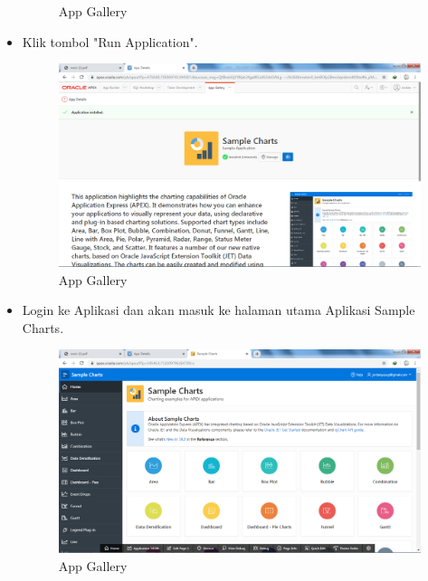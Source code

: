 \documentclass[12pt, times new roman]{article}
\begin{document}
\begin{itemize}
\begin{figure}[!htpb]
	\caption{App Gallery}
\end{figure}
\item Klik tombol "Run Application".
\begin{figure}[!htpb]
	\centering
	\includegraphics[width=12.5cm]{figures/Screenshot_30.png}
	\caption{App Gallery}
\end{figure}
\item Login ke Aplikasi dan akan masuk ke halaman utama Aplikasi Sample Charts.
\begin{figure}[!htpb]
	\centering
	\includegraphics[width=12.5cm]{figures/Screenshot_31.png}
	\caption{App Gallery}
\end{figure}
\end{itemize}
\end{document}
